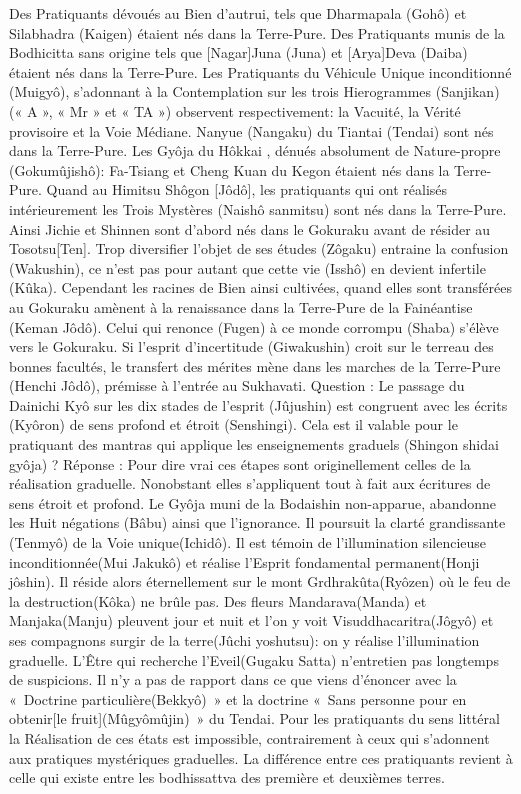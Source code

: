 Des Pratiquants dévoués au Bien d'autrui, tels que Dharmapala (Gohô) et Silabhadra (Kaigen) étaient nés dans la Terre-Pure. Des Pratiquants munis de la Bodhicitta sans origine tels que [Nagar]Juna (Juna) et [Arya]Deva (Daiba) étaient nés dans la Terre-Pure. Les Pratiquants du Véhicule Unique inconditionné (Muigyô), s’adonnant à la Contemplation sur les trois Hierogrammes (Sanjikan) (« A »,  « Mr » et « TA ») observent respectivement: la Vacuité, la Vérité provisoire et la  Voie Médiane. 
Nanyue (Nangaku) du Tiantai (Tendai) sont nés dans la Terre-Pure. Les Gyôja du Hôkkai , dénués absolument de Nature-propre (Gokumûjishô): Fa-Tsiang et Cheng Kuan du Kegon étaient nés dans la Terre-Pure.
Quand au  Himitsu Shôgon [Jôdô], les pratiquants qui ont réalisés intérieurement les Trois Mystères (Naishô sanmitsu) sont nés dans la Terre-Pure. Ainsi Jichie et Shinnen sont d'abord nés dans le Gokuraku avant de résider au Tosotsu[Ten]. 
Trop diversifier l’objet de ses études (Zôgaku) entraine la confusion (Wakushin), ce n'est pas pour autant que cette vie (Isshô) en devient infertile (Kûka). Cependant les racines de Bien ainsi cultivées, quand elles sont transférées au Gokuraku amènent à la renaissance dans la Terre-Pure de la Fainéantise (Keman Jôdô). Celui qui renonce (Fugen) à ce monde corrompu (Shaba) s’élève vers le Gokuraku. Si l'esprit d’incertitude (Giwakushin) croit sur le terreau des bonnes facultés, le transfert des mérites mène dans les marches de la Terre-Pure (Henchi Jôdô), prémisse à l’entrée au Sukhavati.
Question : Le passage du Dainichi Kyô sur les dix stades de l’esprit (Jûjushin) est congruent avec les écrits (Kyôron) de sens profond et étroit (Senshingi). Cela est il valable pour le pratiquant des mantras qui applique les enseignements graduels (Shingon shidai gyôja)  ?
Réponse : Pour dire vrai ces étapes sont originellement celles de la réalisation graduelle. Nonobstant elles s’appliquent tout à fait aux écritures de sens étroit et profond.
Le Gyôja muni de la Bodaishin non-apparue, abandonne les Huit négations (Bâbu) ainsi que l'ignorance. Il poursuit la clarté grandissante (Tenmyô) de la Voie unique(Ichidô). Il est témoin de l’illumination silencieuse inconditionnée(Mui Jakukô) et réalise l'Esprit fondamental permanent(Honji jôshin). Il réside alors éternellement sur le mont Grdhrakûta(Ryôzen) où le feu de la destruction(Kôka) ne brûle pas. Des fleurs Mandarava(Manda) et Manjaka(Manju) pleuvent jour et nuit et l’on y voit Visuddhacaritra(Jôgyô) et ses compagnons surgir de la terre(Jûchi yoshutsu): on y réalise l’illumination graduelle. L’Être qui recherche l’Eveil(Gugaku Satta) n’entretien pas longtemps de suspicions. Il n’y a pas de rapport dans ce que viens d’énoncer avec la « Doctrine particulière(Bekkyô) » et la doctrine « Sans personne pour en obtenir[le fruit](Mûgyômûjin) » du Tendai.
Pour les pratiquants du sens littéral la Réalisation de ces états est impossible, contrairement à ceux qui s’adonnent aux pratiques mystériques graduelles. La différence entre ces pratiquants revient à celle qui existe entre les bodhissattva des première et deuxièmes terres.

